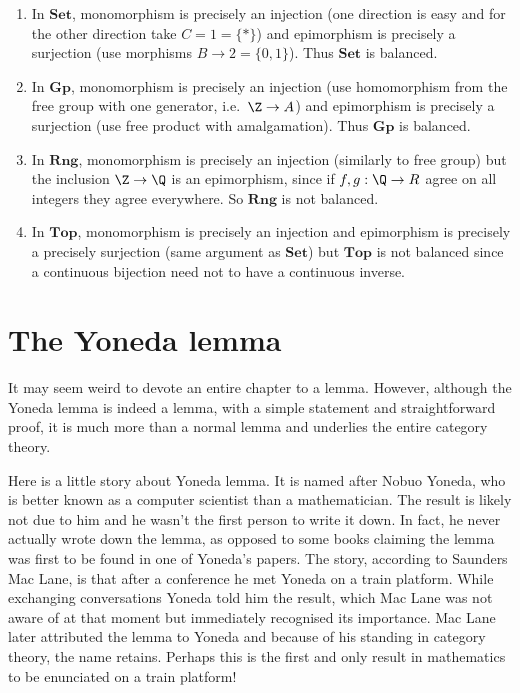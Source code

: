 \documentclass[a4paper]{article}
\renewcommand{\c}[1]{\mathbf{#1}}
\newcommand{\Set}{{\c{Set}}}
\newcommand{\Top}{{\c{Top}}}
\begin{document}
\begin{eg}\leavevmode
  \begin{enumerate}
  \item In \(\Set\), monomorphism is precisely an injection (one direction is easy and for the other direction take \(C = 1 = \{*\}\)) and epimorphism is precisely a surjection (use morphisms \(B \to 2 = \{0, 1\}\)). Thus \(\Set\) is balanced.
  \item In \(\c{Gp}\), monomorphism is precisely an injection (use homomorphism from the free group with one generator, i.e.\ \(\Z \to A\)) and epimorphism is precisely a surjection (use free product with amalgamation). Thus \(\c{Gp}\) is balanced.
  \item In \(\c{Rng}\), monomorphism is precisely an injection (similarly to free group) but the inclusion \(\Z \to \Q\) is an epimorphism, since if \(f, g: \Q \to R\) agree on all integers they agree everywhere. So \(\c{Rng}\) is not balanced.
  \item In \(\Top\), monomorphism is precisely an injection and epimorphism is precisely a precisely surjection (same argument as \(\Set\)) but \(\c{Top}\) is not balanced since a continuous bijection need not to have a continuous inverse.
  \end{enumerate}
\end{eg}

\section{The Yoneda lemma}

It may seem weird to devote an entire chapter to a lemma. However, although the Yoneda lemma is indeed a lemma, with a simple statement and straightforward proof, it is much more than a normal lemma and underlies the entire category theory.

Here is a little story about Yoneda lemma. It is named after Nobuo Yoneda, who is better known as a computer scientist than a mathematician. The result is likely not due to him and he wasn't the first person to write it down. In fact, he never actually wrote down the lemma, as opposed to some books claiming the lemma was first to be found in one of Yoneda's papers. The story, according to Saunders Mac Lane, is that after a conference he met Yoneda on a train platform. While exchanging conversations Yoneda told him the result, which Mac Lane was not aware of at that moment but immediately recognised its importance. Mac Lane later attributed the lemma to Yoneda and because of his standing in category theory, the name retains. Perhaps this is the first and only result in mathematics to be enunciated on a train platform!
\end{document}
